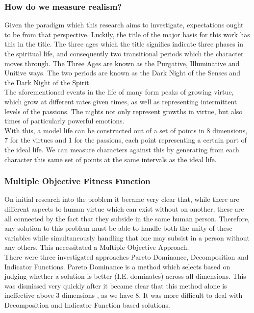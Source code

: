 \documentclass[11pt]{article}
\begin{document}
\subsubsection{How do we measure realism?}
Given the paradigm which this research aims to investigate, expectations ought to be from that perspective. Luckily, the title of the major basis for this work has this in the title. The three ages which the title signifies indicate three phases in the spiritual life, and consequently two transitional periods which the character moves through. The Three Ages are known as the Purgative, Illuminative and Unitive ways. The two periods are known as the Dark Night of the Senses and the Dark Night of the Spirit. \\
The aforementioned events in the life of many form peaks of growing virtue, which grow at different rates given times, as well as representing intermittent levels of the passions. The nights not only represent growths in virtue, but also times of particularly powerful emotions.\\

With this, a model life can be constructed out of a set of points in 8 dimensions, 7 for the virtues and 1 for the passions, each point representing a certain part of the ideal life. We can measure characters against this by generating from each character this same set of points at the same intervals as the ideal life. \\

\subsubsection{Multiple Objective Fitness Function}
On initial research into the problem it became very clear that, while there are different aspects to human virtue which can exist without on another, these are all connected by the fact that they subside in the same human person. Therefore, any solution to this problem must be able to handle both the unity of these variables while simultaneously handling that one may subsist in a person without any others. This necessitated a Multiple Objective Approach. \\

There were three investigated approaches \: Pareto Dominance, Decomposition and Indicator Functions. Pareto Dominance is a method which selects based on judging whether a solution is better (I.E. dominates) across all dimensions. This was dismissed very quickly after it became clear that this method alone is ineffective above 3 dimensions \cite{AchievementScalarazingIndicatorBased}, as we have 8. It was more difficult to deal with Decomposition and Indicator Function based solutions.\\
\end{document}
